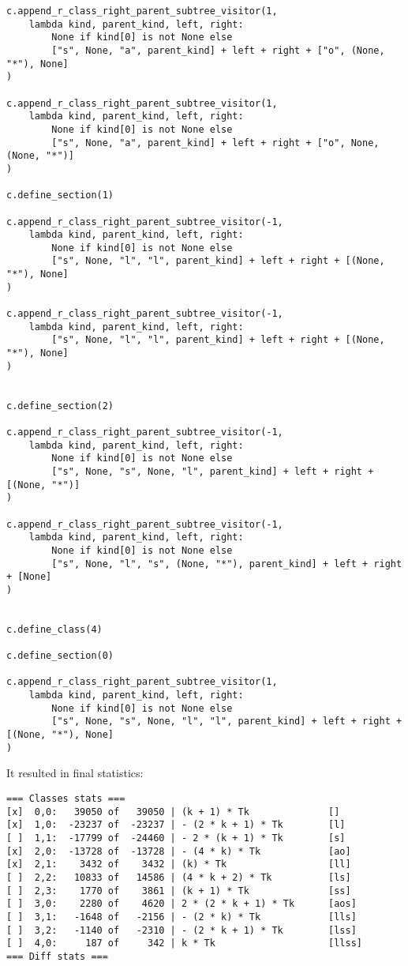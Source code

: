 \documentclass[final]{article}
\theoremstyle{definition}
\theoremstyle{definition}
\theoremstyle{remark}
\begin{document}
\begin{lstlisting}
c.append_r_class_right_parent_subtree_visitor(1,
    lambda kind, parent_kind, left, right:
        None if kind[0] is not None else
        ["s", None, "a", parent_kind] + left + right + ["o", (None, "*"), None]
)

c.append_r_class_right_parent_subtree_visitor(1,
    lambda kind, parent_kind, left, right:
        None if kind[0] is not None else
        ["s", None, "a", parent_kind] + left + right + ["o", None, (None, "*")]
)

c.define_section(1)

c.append_r_class_right_parent_subtree_visitor(-1,
    lambda kind, parent_kind, left, right:
        None if kind[0] is not None else
        ["s", None, "l", "l", parent_kind] + left + right + [(None, "*"), None]
)

c.append_r_class_right_parent_subtree_visitor(-1,
    lambda kind, parent_kind, left, right:
        ["s", None, "l", "l", parent_kind] + left + right + [(None, "*"), None]
)


c.define_section(2)

c.append_r_class_right_parent_subtree_visitor(-1,
    lambda kind, parent_kind, left, right:
        None if kind[0] is not None else
        ["s", None, "s", None, "l", parent_kind] + left + right + [(None, "*")]
)

c.append_r_class_right_parent_subtree_visitor(-1,
    lambda kind, parent_kind, left, right:
        None if kind[0] is not None else
        ["s", None, "l", "s", (None, "*"), parent_kind] + left + right + [None]
)


c.define_class(4)

c.define_section(0)

c.append_r_class_right_parent_subtree_visitor(1,
    lambda kind, parent_kind, left, right:
        None if kind[0] is not None else
        ["s", None, "s", None, "l", "l", parent_kind] + left + right + [(None, "*"), None]
)
\end{lstlisting}

It resulted in final statistics:

\begin{lstlisting}
=== Classes stats ===
[x]  0,0:   39050 of   39050 | (k + 1) * Tk              []
[x]  1,0:  -23237 of  -23237 | - (2 * k + 1) * Tk        [l]
[ ]  1,1:  -17799 of  -24460 | - 2 * (k + 1) * Tk        [s]
[x]  2,0:  -13728 of  -13728 | - (4 * k) * Tk            [ao]
[x]  2,1:    3432 of    3432 | (k) * Tk                  [ll]
[ ]  2,2:   10833 of   14586 | (4 * k + 2) * Tk          [ls]
[ ]  2,3:    1770 of    3861 | (k + 1) * Tk              [ss]
[ ]  3,0:    2280 of    4620 | 2 * (2 * k + 1) * Tk      [aos]
[ ]  3,1:   -1648 of   -2156 | - (2 * k) * Tk            [lls]
[ ]  3,2:   -1140 of   -2310 | - (2 * k + 1) * Tk        [lss]
[ ]  4,0:     187 of     342 | k * Tk                    [llss]
=== Diff stats ===
\end{lstlisting}
\end{document}
